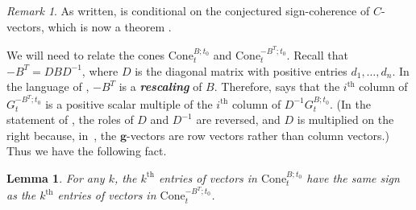 \documentclass{amsart}
\newtheorem{lemma}[proposition]{Lemma}
\theoremstyle{definition}
\theoremstyle{remark}
\newtheorem{remark}[proposition]{Remark}
\numberwithin{equation}{section}
\newcommand{\newword}[1]{\textbf{\emph{#1}}}
\renewcommand{\th}{^\text{th}}
\newcommand{\0}{{\mathbf{0}}}
\newcommand{\Cone}{\mathrm{Cone}}
\newcommand{\g}{\mathbf{g}}
\renewcommand{\th}{^\text{th}}
\newcommand{\symmetrizer}{{D}}
\begin{document}
\begin{remark}\label{conditional}
As written, \cite[Proposition~8.13]{universal} is conditional on the conjectured sign-coherence of $C$-vectors, which is now a theorem \cite[Corollary~5.5]{GHKK}.
\end{remark}

We will need to relate the cones $\Cone^{B;t_0}_t$ and $\Cone^{-B^T;t_0}_t$.
Recall that $-B^T=\symmetrizer B\symmetrizer^{-1}$, where $\symmetrizer$ is the diagonal matrix with positive entries $d_1,\ldots,d_n$.
In the language of \cite[Section~7]{universal}, $-B^T$ is a \newword{rescaling} of $B$.
Therefore, \cite[Proposition~8.20]{universal} says that the $i\th$ column of $G_t^{-B^T;t_0}$ is a positive scalar multiple of the $i\th$ column of $\symmetrizer^{-1}G_t^{B;t_0}$.
(In the statement of \cite[Proposition~8.20]{universal}, the roles of $\symmetrizer$ and $\symmetrizer^{-1}$ are reversed, and $\symmetrizer$ is multiplied on the right because, in~\cite{universal}, the $\g$-vectors are row vectors rather than column vectors.)
Thus we have the following fact.
\begin{lemma}\label{B or -BT}
For any $k$, the $k\th$ entries of vectors in $\Cone^{B;t_0}_t$ have the same sign as the $k\th$ entries of vectors in $\Cone^{-B^T;t_0}_t$.
\end{lemma}
\end{document}
